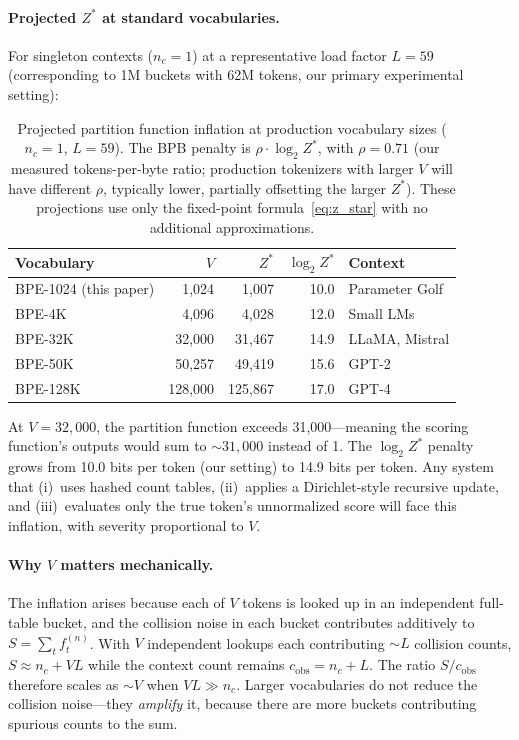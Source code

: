 \documentclass[11pt]{article}
\begin{document}
\paragraph{Projected $Z^*$ at standard vocabularies.} For singleton contexts ($n_c = 1$) at a representative load factor $L = 59$ (corresponding to 1M buckets with 62M tokens, our primary experimental setting):

\begin{table}[h]
\centering
\caption{Projected partition function inflation at production vocabulary sizes ($n_c = 1$, $L = 59$). The BPB penalty is $\rho \cdot \log_2 Z^*$, with $\rho = 0.71$ (our measured tokens-per-byte ratio; production tokenizers with larger $V$ will have different $\rho$, typically lower, partially offsetting the larger $Z^*$). These projections use only the fixed-point formula~\eqref{eq:z_star} with no additional approximations.}
\label{tab:scaling}
\begin{tabular}{lrrrl}
\toprule
Vocabulary & $V$ & $Z^*$ & $\log_2 Z^*$ & Context \\
\midrule
BPE-1024 (this paper) & 1,024 & 1,007 & 10.0 & Parameter Golf \\
BPE-4K & 4,096 & 4,028 & 12.0 & Small LMs \\
BPE-32K & 32,000 & 31,467 & 14.9 & LLaMA, Mistral \\
BPE-50K & 50,257 & 49,419 & 15.6 & GPT-2 \\
BPE-128K & 128,000 & 125,867 & 17.0 & GPT-4 \\
\bottomrule
\end{tabular}
\end{table}

\noindent At $V = 32{,}000$, the partition function exceeds 31,000---meaning the scoring function's outputs would sum to ${\sim}31{,}000$ instead of 1. The $\log_2 Z^*$ penalty grows from 10.0 bits per token (our setting) to 14.9 bits per token. Any system that (i)~uses hashed count tables, (ii)~applies a Dirichlet-style recursive update, and (iii)~evaluates only the true token's unnormalized score will face this inflation, with severity proportional to $V$.

\paragraph{Why $V$ matters mechanically.} The inflation arises because each of $V$ tokens is looked up in an independent full-table bucket, and the collision noise in each bucket contributes additively to $S = \sum_t f_t^{(n)}$. With $V$ independent lookups each contributing ${\sim}L$ collision counts, $S \approx n_c + VL$ while the context count remains $c_{\text{obs}} = n_c + L$. The ratio $S/c_{\text{obs}}$ therefore scales as ${\sim}V$ when $VL \gg n_c$. Larger vocabularies do not reduce the collision noise---they \emph{amplify} it, because there are more buckets contributing spurious counts to the sum.
\end{document}
